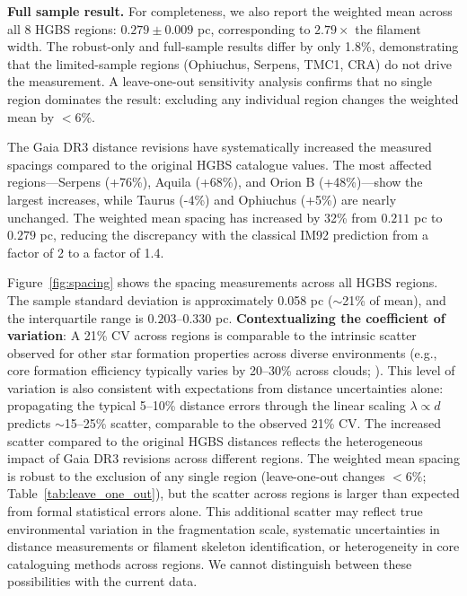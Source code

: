 \documentclass[twoside,twocolumn]{mnras}
\begin{document}
\textbf{Full sample result.} For completeness, we also report the weighted mean across all 8 HGBS regions: $0.279 \pm 0.009$ pc, corresponding to $2.79\times$ the filament width. The robust-only and full-sample results differ by only 1.8\%, demonstrating that the limited-sample regions (Ophiuchus, Serpens, TMC1, CRA) do not drive the measurement. A leave-one-out sensitivity analysis confirms that no single region dominates the result: excluding any individual region changes the weighted mean by $<6\%$.

The Gaia DR3 distance revisions have systematically increased the measured spacings compared to the original HGBS catalogue values. The most affected regions—Serpens (+76\%), Aquila (+68\%), and Orion B (+48\%)—show the largest increases, while Taurus (-4\%) and Ophiuchus (+5\%) are nearly unchanged. The weighted mean spacing has increased by 32\% from $0.211$ pc to $0.279$ pc, reducing the discrepancy with the classical IM92 prediction from a factor of 2 to a factor of 1.4.

Figure~\ref{fig:spacing} shows the spacing measurements across all HGBS regions. The sample standard deviation is approximately 0.058 pc ($\sim$21\% of mean), and the interquartile range is $0.203$--$0.330$ pc. \textbf{Contextualizing the coefficient of variation}: A 21\% CV across regions is comparable to the intrinsic scatter observed for other star formation properties across diverse environments (e.g., core formation efficiency typically varies by 20--30\% across clouds; \citet{Molinari2022}). This level of variation is also consistent with expectations from distance uncertainties alone: propagating the typical 5--10\% distance errors through the linear scaling $\lambda \propto d$ predicts $\sim$15--25\% scatter, comparable to the observed 21\% CV. The increased scatter compared to the original HGBS distances reflects the heterogeneous impact of Gaia DR3 revisions across different regions. The weighted mean spacing is robust to the exclusion of any single region (leave-one-out changes $<6\%$; Table~\ref{tab:leave_one_out}), but the scatter across regions is larger than expected from formal statistical errors alone. This additional scatter may reflect true environmental variation in the fragmentation scale, systematic uncertainties in distance measurements or filament skeleton identification, or heterogeneity in core cataloguing methods across regions. We cannot distinguish between these possibilities with the current data.
\end{document}
